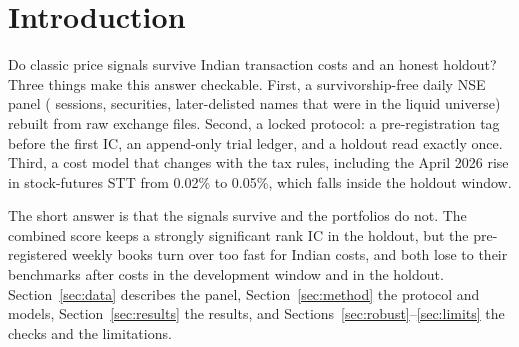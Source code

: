 \section{Introduction}
Do classic price signals survive Indian transaction costs and an honest holdout? Three things make this answer checkable. First, a survivorship-free
daily NSE panel ( sessions,  securities,  later-delisted names that were in the
liquid universe) rebuilt from raw exchange files. Second, a locked protocol: a pre-registration tag before the first IC, an append-only trial
ledger, and a holdout read exactly once. Third, a cost model that changes with the tax rules, including the April 2026 rise in stock-futures STT
from 0.02\% to 0.05\%, which falls inside the holdout window.

The short answer is that the signals survive and the portfolios do not. The combined score keeps a strongly significant rank IC in the
holdout, but the pre-registered weekly books turn over too fast for Indian costs, and both lose to their benchmarks after costs in the
development window and in the holdout. Section~\ref{sec:data} describes the panel, Section~\ref{sec:method} the protocol and models,
Section~\ref{sec:results} the results, and Sections~\ref{sec:robust}--\ref{sec:limits} the checks and the limitations.
